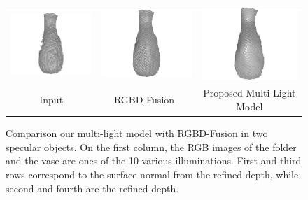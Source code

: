 \begin{figure}[!ht]
{\begin{tabular}{c|c c}
   \includegraphics[height = 0.24\linewidth]{figures/result/robust_vase_shape_init.pdf} 
   &
   \includegraphics[height = 0.24\linewidth]{figures/result/rgbd_vase_shape.pdf} &
   \includegraphics[height = 0.24\linewidth]{figures/result/robust_vase_shape.pdf}\\


   {Input} & {RGBD-Fusion~\cite{or2015rgbd}} & {Proposed Multi-Light Model}               
 \end{tabular}}
\caption{Comparison our multi-light model with RGBD-Fusion in two specular objects. On the first column, the RGB images of the folder and the vase are ones of  the 10 various illuminations. First and third rows correspond to the surface normal from the refined depth, while second and fourth are the refined depth.}
\label{fig:comp_complicated_albedo}
\end{figure}




